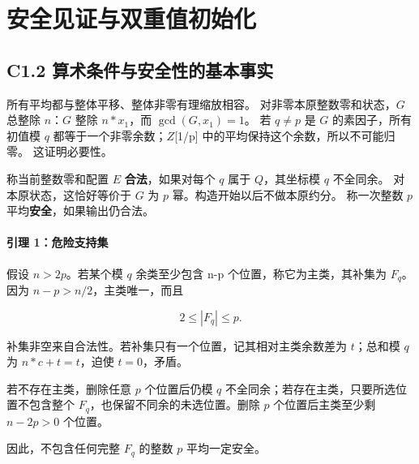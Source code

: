 \section{安全见证与双重值初始化}\label{construct:safety}
\subsection*{\texorpdfstring{{C1.2} {算术条件与安全性的基本事实}}{C1.2 算术条件与安全性的基本事实}}\label{C1-h1}

{所有平均都与整体平移、整体非零有理缩放相容。} {对非零本原整数零和状态，\ensuremath{G}} {总整除} {\ensuremath{n}：\ensuremath{G}} {整除} {\ensuremath{n*x_{1}}，而} {\ensuremath{\operatorname{gcd}(G,x_{1})=1}。} {若} {\ensuremath{q\ne p}} {是} {\ensuremath{G}} {的素因子，所有初值模} {\ensuremath{q}} {都等于一个非零余数；\ensuremath{Z}{[}1/p{]}} {中的平均保持这个余数，所以不可能归零。} {这证明必要性。}

{称当前整数零和配置} {\ensuremath{E}} \textbf{{合法}}{，如果对每个} {\ensuremath{q}} {属于} {\ensuremath{Q}，其坐标模} {\ensuremath{q}} {不全同余。} {对本原状态，这恰好等价于} {\ensuremath{G}} {为} {\ensuremath{p}} {幂。构造开始以后不做本原约分。} {称一次整数} {\ensuremath{p}} {平均}\textbf{{安全}}{，如果输出仍合法。}

\paragraph*{\texorpdfstring{{引理} {1：危险支持集}}{引理 1：危险支持集}}\label{C1-h2}

{假设} {\ensuremath{n>2p}。若某个模} {\ensuremath{q}} {余类至少包含} {n-p} {个位置，称它为主类，其补集为} {\ensuremath{F_{q}}。} {因为} {\ensuremath{n-p>n/2}，主类唯一，而且}

\[
2\le |F_q|\le p.
\]

{补集非空来自合法性。若补集只有一个位置，记其相对主类余数差为} {\ensuremath{t}；总和模} {\ensuremath{q}} {为} {\ensuremath{n*c+t=t}，迫使} {\ensuremath{t=0}，矛盾。}

{若不存在主类，删除任意} {\ensuremath{p}} {个位置后仍模} {\ensuremath{q}} {不全同余；若存在主类，只要所选位置不包含整个} {\ensuremath{F_{q}}，也保留不同余的未选位置。删除} {\ensuremath{p}} {个位置后主类至少剩} {\ensuremath{n-2p>0}} {个位置。}

{因此，不包含任何完整} {\ensuremath{F_{q}}} {的整数} {\ensuremath{p}} {平均一定安全。}

